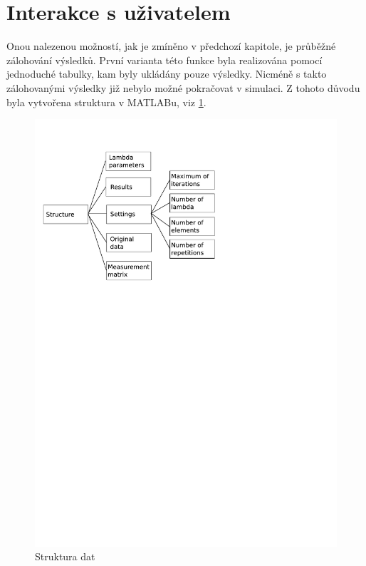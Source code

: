 \documentclass[FM,BP]{tulthesis}
\begin{document}
\section{Interakce s uživatelem}
Onou nalezenou možností, jak je zmíněno v předchozí kapitole, je průběžné zálohování výsledků. První varianta této funkce byla realizována pomocí jednoduché tabulky, kam byly ukládány pouze výsledky. Nicméně s takto zálohovanými výsledky již nebylo možné pokračovat v simulaci. Z tohoto důvodu byla vytvořena struktura v MATLABu, viz \ref{fig:struktura}.

\begin{figure}[!ht]
	\begin{center}
		\includegraphics[scale=0.6]{obr/structure.pdf}
	\end{center}
	\caption{Struktura dat}
	\label{fig:struktura}
\end{figure}
\end{document}
